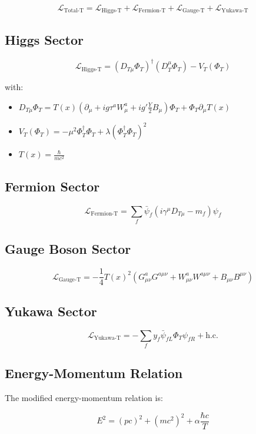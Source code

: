 \documentclass{article}
\begin{document}
	\begin{equation}
		\mathcal{L}_{\text{Total-T}} = \mathcal{L}_{\text{Higgs-T}} + \mathcal{L}_{\text{Fermion-T}} + \mathcal{L}_{\text{Gauge-T}} + \mathcal{L}_{\text{Yukawa-T}}
	\end{equation}
	
	\subsection{Higgs Sector}
	\begin{equation}
		\mathcal{L}_{\text{Higgs-T}} = (D_{T\mu} \Phi_T)^\dagger (D_T^\mu \Phi_T) - V_T(\Phi_T)
	\end{equation}
	
	with:
	\begin{itemize}
		\item \( D_{T\mu} \Phi_T = T(x) (\partial_\mu + i g \tau^a W_\mu^a + i g' \frac{Y}{2} B_\mu) \Phi_T + \Phi_T \partial_\mu T(x) \)
		\item \( V_T(\Phi_T) = -\mu^2 \Phi_T^\dagger \Phi_T + \lambda (\Phi_T^\dagger \Phi_T)^2 \)
		\item \( T(x) = \frac{\hbar}{m c^2} \)
	\end{itemize}
	
	\subsection{Fermion Sector}
	\begin{equation}
		\mathcal{L}_{\text{Fermion-T}} = \sum_f \bar{\psi}_f (i \gamma^\mu D_{T\mu} - m_f) \psi_f
	\end{equation}
	
	\subsection{Gauge Boson Sector}
	\begin{equation}
		\mathcal{L}_{\text{Gauge-T}} = -\frac{1}{4} T(x)^2 (G_{\mu\nu}^a G^{a\mu\nu} + W_{\mu\nu}^a W^{a\mu\nu} + B_{\mu\nu} B^{\mu\nu})
	\end{equation}
	
	\subsection{Yukawa Sector}
	\begin{equation}
		\mathcal{L}_{\text{Yukawa-T}} = -\sum_f y_f \bar{\psi}_{fL} \Phi_T \psi_{fR} + \text{h.c.}
	\end{equation}
	
	\subsection{Energy-Momentum Relation}
	The modified energy-momentum relation is:
	
	\begin{equation}
		E^2 = (p c)^2 + (m c^2)^2 + \alpha \frac{\hbar c}{T}
	\end{equation}
	
\end{document}
